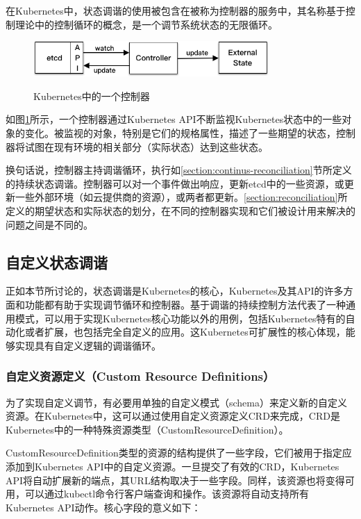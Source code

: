 \documentclass[macfonts,master]{njuthesis}
\begin{document}
在Kubernetes中，状态调谐的使用被包含在被称为控制器的服务中，其名称基于控制理论中的控制循环的概念，是一个调节系统状态的无限循环\cite{k8scontroller}。

\begin{figure}[htbp]
  \centering
  \includegraphics[width= 0.8\textwidth]{pics/controller-pattern.png}\\
  \caption{Kubernetes中的一个控制器}\label{fig:k8s-controller-pattern}
\end{figure}

如图\ref{fig:k8s-controller-pattern}所示，一个控制器通过Kubernetes API不断监视Kubernetes状态中的一些对象的变化。被监视的对象，特别是它们的规格属性，描述了一些期望的状态，控制器将试图在现有环境的相关部分（实际状态）达到这些状态。

换句话说，控制器主持调谐循环，执行如\ref{section:continus-reconciliation}节所定义的持续状态调谐。控制器可以对一个事件做出响应，更新etcd中的一些资源，或更新一些外部环境（如云提供商的资源），或两者都更新。\ref{section:reconciliation}所定义的期望状态和实际状态的划分，在不同的控制器实现和它们被设计用来解决的问题之间是不同的。

\subsection{自定义状态调谐}\label{section:custom-reconciliation}

正如本节所讨论的，状态调谐是Kubernetes的核心，Kubernetes及其API的许多方面和功能都有助于实现调节循环和控制器。基于调谐的持续控制方法代表了一种通用模式，可以用于实现Kubernetes核心功能以外的用例，包括Kubernetes特有的自动化或者扩展，也包括完全自定义的应用。这Kubernetes可扩展性的核心体现，能够实现具有自定义逻辑的调谐循环。

\subsubsection{自定义资源定义（Custom Resource Definitions）}

为了实现自定义调节，有必要用单独的自定义模式（schema）来定义新的自定义资源。在Kubernetes中，这可以通过使用自定义资源定义CRD来完成，CRD是Kubernetes中的一种特殊资源类型（CustomResourceDefinition）。

CustomResourceDefinition类型的资源的结构提供了一些字段，它们被用于指定应添加到Kubernetes API中的自定义资源。一旦提交了有效的CRD，Kubernetes API将自动扩展新的端点，其URL结构取决于一些字段。同样，该资源也将变得可用，可以通过kubectl命令行客户端查询和操作。该资源将自动支持所有Kubernetes API动作。核心字段的意义如下：
\end{document}
